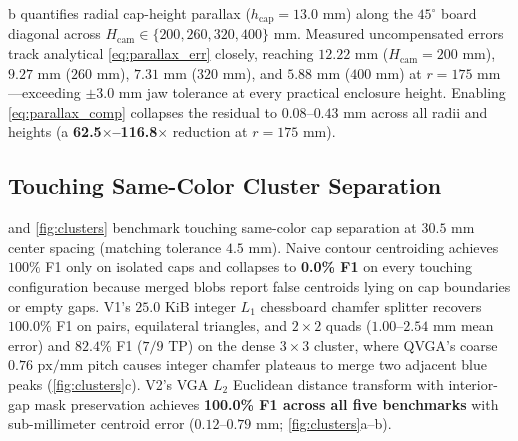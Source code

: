 \documentclass[10pt,twocolumn,letterpaper]{article}
\begin{document}
b quantifies radial cap-height parallax ($h_{\mathrm{cap}}=13.0\text{ mm}$) along the $45^\circ$ board diagonal across $H_{\mathrm{cam}} \in \{200, 260, 320, 400\}\text{ mm}$. Measured uncompensated errors track analytical \cref{eq:parallax_err} closely, reaching $12.22\text{ mm}$ ($H_{\mathrm{cam}}=200\text{ mm}$), $9.27\text{ mm}$ ($260\text{ mm}$), $7.31\text{ mm}$ ($320\text{ mm}$), and $5.88\text{ mm}$ ($400\text{ mm}$) at $r=175\text{ mm}$—exceeding $\pm 3.0\text{ mm}$ jaw tolerance at every practical enclosure height. Enabling \cref{eq:parallax_comp} collapses the residual to $0.08\text{--}0.43\text{ mm}$ across all radii and heights (a \textbf{62.5$\times$--116.8$\times$} reduction at $r=175\text{ mm}$).

\subsection{Touching Same-Color Cluster Separation}
 and \cref{fig:clusters} benchmark touching same-color cap separation at $30.5\text{ mm}$ center spacing (matching tolerance $4.5\text{ mm}$). Naive contour centroiding achieves $100\%$ F1 only on isolated caps and collapses to \textbf{0.0\% F1} on every touching configuration because merged blobs report false centroids lying on cap boundaries or empty gaps. V1's $25.0\text{ KiB}$ integer $L_1$ chessboard chamfer splitter recovers $100.0\%$ F1 on pairs, equilateral triangles, and $2\times 2$ quads ($1.00\text{--}2.54\text{ mm}$ mean error) and $82.4\%$ F1 ($7/9$ TP) on the dense $3\times 3$ cluster, where QVGA's coarse $0.76\text{ px/mm}$ pitch causes integer chamfer plateaus to merge two adjacent blue peaks (\cref{fig:clusters}c). V2's VGA $L_2$ Euclidean distance transform with interior-gap mask preservation achieves \textbf{100.0\% F1 across all five benchmarks} with sub-millimeter centroid error ($0.12\text{--}0.79\text{ mm}$; \cref{fig:clusters}a--b).
\end{document}
